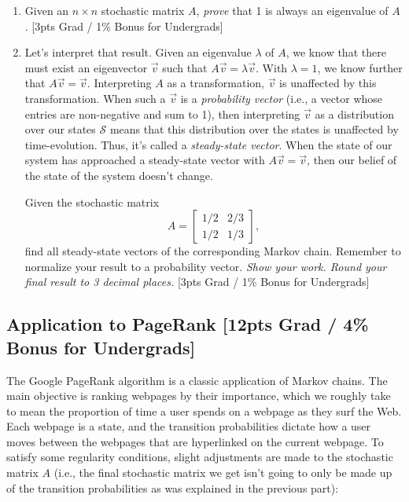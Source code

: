 \begin{enumerate}[label=\alph*.]
    \item Given an $n \times n$ stochastic matrix $A$, \emph{prove} that 1 is always an eigenvalue of $A$. [3pts Grad / 1\% Bonus for Undergrads]

    \item Let's interpret that result. Given an eigenvalue $\lambda$ of $A$, we know that there must exist an eigenvector $\vec{v}$ such that $A\vec{v} = \lambda\vec{v}$. With $\lambda=1$, we know further that $A\vec{v}=\vec{v}$. Interpreting $A$ as a transformation, $\vec{v}$ is unaffected by this transformation. When such a $\vec{v}$ is a \textit{probability vector} (i.e., a vector whose entries are non-negative and sum to 1), then interpreting $\vec{v}$ as a distribution over our states $\mathcal{S}$ means that this distribution over the states is unaffected by time-evolution. Thus, it's called a \textit{steady-state vector}. When the state of our system has approached a steady-state vector with $A\vec{v}=\vec{v}$, then our belief of the state of the system doesn't change.

    \smallskip Given the stochastic matrix $$A = \begin{bmatrix}1/2 & 2/3 \\ 1/2 & 1/3\end{bmatrix},$$
    find all steady-state vectors of the corresponding Markov chain. Remember to normalize your result to a probability vector. \emph{Show your work. Round your final result to 3 decimal places.} [3pts Grad / 1\% Bonus for Undergrads]
\end{enumerate}
\newpage



\subsection{Application to PageRank [12pts Grad / 4\% Bonus for Undergrads]}
The Google PageRank algorithm is a classic application of Markov chains. The main objective is ranking webpages by their importance, which we roughly take to mean the proportion of time a user spends on a webpage as they surf the Web. Each webpage is a state, and the transition probabilities dictate how a user moves between the webpages that are hyperlinked on the current webpage. To satisfy some regularity conditions, slight adjustments are made to the stochastic matrix $A$ (i.e., the final stochastic matrix we get isn't going to only be made up of the transition probabilities as was explained in the previous part):

